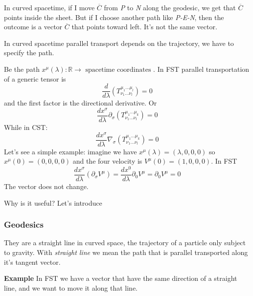 In curved spacetime, if I move $\overline{C}$ from \emph{P} to \emph{N} along the geodesic, we get that $\overline{C}$ points inside the sheet. But if I choose another path like \emph{P-E-N}, then the outcome is a vector $\overline{C}$ that points toward left. It's not the same vector. \par
In curved spacetime parallel transport depends on the trajectory, we have to specify the path.\par
Be the path $x^{\mu }\left( \lambda  \right) : \mathbb{R} \to \text{ spacetime coordinates }$. In FST parallel transportation of a generic tensor is
\[
\frac{d}{d\lambda } \left( T^{\mu _{1} \ldots \mu _{l}}_{\nu _{1}\ldots \nu _{l}} \right) = 0
\]
and the first factor is the directional derivative. Or
\[
\frac{d x^{\sigma }}{d \lambda } \partial_{\sigma } \left( T^{\mu _{1}\ldots \mu _{k}}_{\nu _{1}\ldots \nu _{l}} \right) = 0
\]
While in CST:
\[
\frac{dx^{\sigma }}{d\lambda } \nabla _{\sigma } \left(T^{\mu _{1}\ldots \mu _{k}}_{\nu _{1}\ldots \nu _{l}} \right) = 0
\]
Let's see a simple example: imagine we have $x^{\mu }\left( \lambda  \right) = \left( \lambda , 0, 0 , 0 \right)$ so $x^{\mu }\left( 0 \right) = \left( 0,0,0,0 \right)$ and the four velocity is $V^{\mu }\left( 0 \right) = \left( 1,0,0,0 \right)$.
In FST 
\[
\frac{dx^{\sigma }}{d\lambda } \left( \partial_{\sigma }V^{\mu } \right) = \frac{dx^{0}}{d\lambda } \partial_{0}V^{\mu } = \partial_{0}V^{\mu } = 0
\]
The vector does not change. \par

Why is it useful? Let's introduce
\subsubsection{Geodesics}
They are a straight line in curved space, the trajectory of a particle only subject to gravity. With \emph{straight line} we mean the path that is parallel transported along it's tangent vector.

\textbf{Example} In FST we have a vector that have the same direction of a straight line, and we want to move it along that line. 



